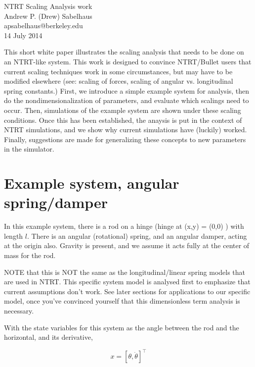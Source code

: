 \documentclass[12pt,letterpaper]{article}
\begin{document}

\begin{center}
\huge
NTRT Scaling Analysis work\\
\normalsize
\vspace{0.1in}
Andrew P. (Drew) Sabelhaus\\
apsabelhaus@berkeley.edu \\
14 July 2014
\end{center}


This short white paper illustrates the scaling analysis that needs to be done on an NTRT-like system.
This work is designed to convince NTRT/Bullet users that current scaling techniques work in some circumstances, but may have to be modified elsewhere (see: scaling of forces, scaling of angular vs. longitudinal spring constants.)
First, we introduce a simple example system for analysis, then do the nondimensionalization of parameters, and evaluate which scalings need to occur.
Then, simulations of the example system are shown under these scaling conditions.
Once this has been established, the anaysis is put in the context of NTRT simulations, and we show why current simulations have (luckily) worked.
Finally, suggestions are made for generalizing these concepts to new parameters in the simulator.

\section{Example system, angular spring/damper}

In this example system, there is a rod on a hinge (hinge at (x,y) = (0,0) ) with length $l$.
There is an angular (rotational) spring, and an angular damper, acting at the origin also.
Gravity is present, and we assume it acts fully at the center of mass for the rod.

NOTE that this is NOT the same as the longitudinal/linear spring models that are used in NTRT.
This specific system model is analysed first to emphasize that current assumptions don't work.
See later sections for applications to our specific model, once you've convinced yourself that this dimensionless term analysis is necessary.

With the state variables for this system as the angle between the rod and the horizontal, and its derivative,

\[
x = [\theta, \dot \theta]^\top
\]
\end{document}
